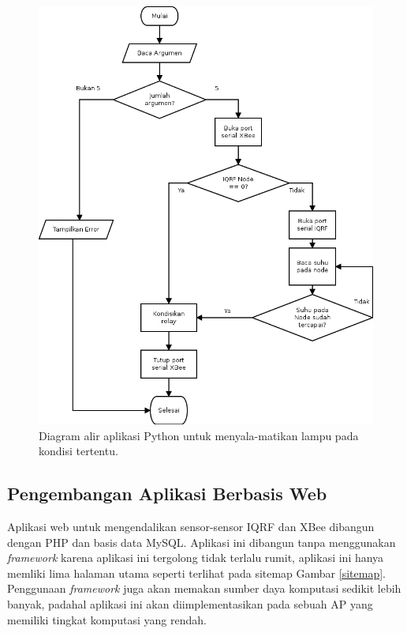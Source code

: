 \begin{enumerate}
					\begin{figure}[ht!]
					  \centering
					    \includegraphics{gambar/python-profile}
					    \caption{Diagram alir aplikasi Python untuk menyala-matikan lampu pada kondisi tertentu.}
					    \label{python-profile}
					\end{figure}

			\end{enumerate}

		\subsection{Pengembangan Aplikasi Berbasis Web}
			Aplikasi web untuk mengendalikan sensor-sensor IQRF dan XBee dibangun dengan PHP dan basis data MySQL. Aplikasi ini dibangun tanpa menggunakan \emph{framework} karena aplikasi ini tergolong tidak terlalu rumit, aplikasi ini hanya memliki lima halaman utama seperti terlihat pada sitemap Gambar \ref{sitemap}. Penggunaan \emph{framework} juga akan memakan sumber daya komputasi sedikit lebih banyak, padahal aplikasi ini akan diimplementasikan pada sebuah AP yang memiliki tingkat komputasi yang rendah.

